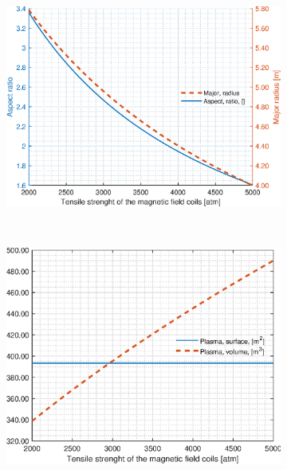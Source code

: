 \begin{figure}[H]
	\begin{subfigure}[h!]{.45\textwidth}
		\includegraphics[width=\textwidth]{MatlabFigures/sigmamax/f3.eps}
	\end{subfigure}
	~
	\begin{subfigure}[h!]{.45\textwidth}
		\includegraphics[width=\textwidth]{MatlabFigures/sigmamax/f4.eps}
	\end{subfigure}


\end{figure}
